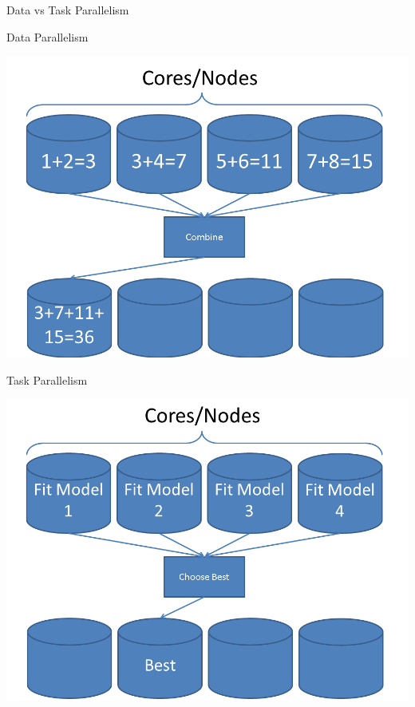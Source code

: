 \begin{frame}
  \begin{block}{Data vs Task Parallelism}\pause
    \begin{center}
    \begin{minipage}{.46\textwidth}
    \begin{block}{\centering Data Parallelism}
      \begin{center}
      \includegraphics[width=.975\textwidth]{../common/pics/parallelism_data}
      \end{center}
      \end{block}
    \end{minipage}
    \hspace{.15cm}
    \begin{minipage}{.46\textwidth}
    \begin{block}{\centering Task Parallelism}
      \begin{center}
      \includegraphics[width=.975\textwidth]{../common/pics/parallelism_task}
      \end{center}
      \end{block}
    \end{minipage}
    \end{center}
  \end{block}
\end{frame}




